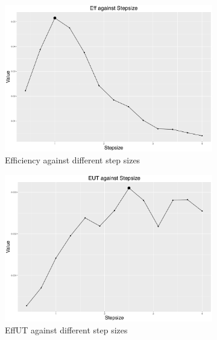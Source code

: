 \begin{figure}[h]
\centering
\begin{subfigure}[t]{0.45\textwidth}
	\includegraphics[width=\textwidth]{Chapters/05MCMCOU/plots/ggeff.pdf}
	\caption{Efficiency against different step sizes}
\end{subfigure}
\begin{subfigure}[t]{0.45\textwidth}
	\includegraphics[width=\textwidth]{Chapters/05MCMCOU/plots/ggeut.pdf}
	\caption{EffUT against different step sizes}
\end{subfigure}
\begin{subfigure}[t]{0.45\textwidth}

\end{subfigure}
\end{figure}
